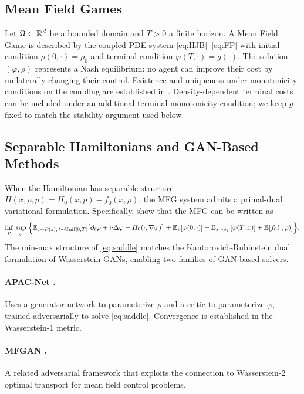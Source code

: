 \subsection{Mean Field Games}

Let $\Omega \subset \mathbb{R}^d$ be a bounded domain and $T > 0$ a finite horizon.
A Mean Field Game is described by the coupled PDE system
\eqref{eq:HJB}--\eqref{eq:FP} with initial condition
$\rho(0,\cdot) = \rho_0$ and terminal condition
$\varphi(T,\cdot) = g(\cdot)$.
The solution $(\varphi, \rho)$ represents a Nash equilibrium: no agent
can improve their cost by unilaterally changing their control.
Existence and uniqueness under monotonicity conditions on the coupling
are established in \citet{lasry2007mean}.  Density-dependent terminal costs
can be included under an additional terminal monotonicity condition; we keep
$g$ fixed to match the stability argument used below.

\subsection{Separable Hamiltonians and GAN-Based Methods}

When the Hamiltonian has separable structure
$H(x,\rho,p) = H_0(x,p) - f_0(x,\rho)$,
the MFG system admits a primal-dual variational formulation.
Specifically, \citet{cao2021connecting} show that the MFG can be written as
\begin{equation}\label{eq:saddle}
  \inf_{\rho}\, \sup_{\varphi}\;
  \Bigl\{
    \mathbb{E}_{z\sim P(z),\, t\sim\mathrm{Unif}[0,T]}
    \bigl[\partial_t\varphi + \nu\Delta\varphi - H_0(\cdot,\nabla\varphi)\bigr]
    + \mathbb{E}_z[\varphi(0,\cdot)] - \mathbb{E}_{x\sim\rho_T}[\varphi(T,x)]
    + \mathbb{E}[f_0(\cdot,\rho)]
  \Bigr\}.
\end{equation}
The min-max structure of \eqref{eq:saddle} matches the
Kantorovich-Rubinstein dual formulation of Wasserstein GANs,
enabling two families of GAN-based solvers.

\paragraph{APAC-Net \citep{lin2021apac}.}
Uses a generator network to parameterize $\rho$ and a critic to parameterize
$\varphi$, trained adversarially to solve \eqref{eq:saddle}.
Convergence is established in the Wasserstein-1 metric.

\paragraph{MFGAN \citep{ruthotto2020machine}.}
A related adversarial framework that exploits the connection to
Wasserstein-2 optimal transport for mean field control problems.

